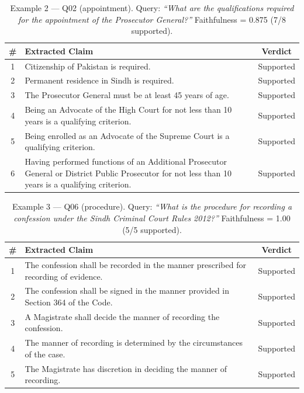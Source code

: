 \documentclass[11pt,a4paper]{article}
\begin{document}
\begin{table}[H]
\centering
\footnotesize
\caption{Example 2 --- Q02 (appointment). Query: \emph{``What are the qualifications required for the appointment of the Prosecutor General?''} Faithfulness = 0.875 (7/8 supported).}
\label{tab:ex2}
\renewcommand{\arraystretch}{1.2}
\begin{tabularx}{\textwidth}{@{}c >{\RaggedRight\arraybackslash}X c@{}}
\toprule
\textbf{\#} & \textbf{Extracted Claim} & \textbf{Verdict} \\
\midrule
1 & Citizenship of Pakistan is required. & Supported \\
2 & Permanent residence in Sindh is required. & Supported \\
3 & The Prosecutor General must be at least 45 years of age. & Supported \\
4 & Being an Advocate of the High Court for not less than 10 years is a qualifying criterion. & Supported \\
5 & Being enrolled as an Advocate of the Supreme Court is a qualifying criterion. & Supported \\
6 & Having performed functions of an Additional Prosecutor General or District Public Prosecutor for not less than 10 years is a qualifying criterion. & Supported \\
\bottomrule
\end{tabularx}
\end{table}

\begin{table}[H]
\centering
\footnotesize
\caption{Example 3 --- Q06 (procedure). Query: \emph{``What is the procedure for recording a confession under the Sindh Criminal Court Rules 2012?''} Faithfulness = 1.00 (5/5 supported).}
\label{tab:ex3}
\renewcommand{\arraystretch}{1.2}
\begin{tabularx}{\textwidth}{@{}c >{\RaggedRight\arraybackslash}X c@{}}
\toprule
\textbf{\#} & \textbf{Extracted Claim} & \textbf{Verdict} \\
\midrule
1 & The confession shall be recorded in the manner prescribed for recording of evidence. & Supported \\
2 & The confession shall be signed in the manner provided in Section 364 of the Code. & Supported \\
3 & A Magistrate shall decide the manner of recording the confession. & Supported \\
4 & The manner of recording is determined by the circumstances of the case. & Supported \\
5 & The Magistrate has discretion in deciding the manner of recording. & Supported \\
\bottomrule
\end{tabularx}
\end{table}
\end{document}
